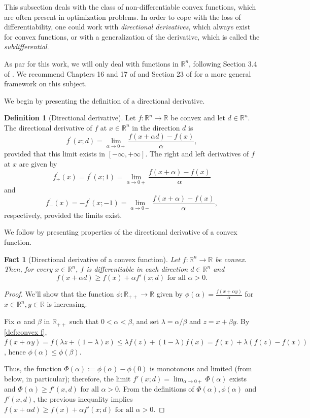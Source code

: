 \documentclass[smallextended,numbook,nospthms]{svjour3}
\theoremstyle{plain}
\newtheorem{fact}[theorem]{Fact}
\theoremstyle{definition}
\newtheorem{definition}[theorem]{Definition}
\def\RR{\mathds R}
\begin{document}
This subsection deals with the class of non-differentiable convex functions, which are often present in optimization problems. In order to cope with the loss of differentiability, one could work with \emph{directional derivatives}, which always exist for convex functions, or with a generalization of the derivative, which is called the \emph{subdifferential}.

As par for this work, we will only deal with functions in $\RR^n$, following Section 3.4 of \cite{Izmailov:2014}. We recommend Chapters 16 and 17 of \cite{BC2011} and Section 23 of \cite{Rockafellar:1996} for a more general framework on this subject.

We begin by presenting the definition of a directional derivative.
\begin{definition}[Directional derivative]\label{def:dir deriv}
Let $f: \RR^n \rightarrow \RR$ be convex and let $d \in \RR^n$. The directional derivative of $f$ at $x \in \RR^n$ in the direction $d$ is
$$
f^{\prime}(x;d)=\lim _{\alpha \rightarrow 0+} \frac{f(x+\alpha d)-f(x)}{\alpha},
$$
provided that this limit exists in $[-\infty,+\infty]$. 
The right and left derivatives of $f$ at $x$ are given by
$$
f_{+}^{\prime}(x)=f^{\prime}(x ; 1)=\lim _{\alpha \rightarrow 0+} \frac{f(x+\alpha)-f(x)}{\alpha}
$$
and
$$
f_{-}^{\prime}(x)=-f^{\prime}(x ;-1)=\lim _{\alpha \rightarrow 0-} \frac{f(x+\alpha)-f(x)}{\alpha},
$$
respectively, provided the limits exist.	
\end{definition}

We follow by presenting properties of the directional derivative of a convex function.
\begin{fact}[Directional derivative of a convex function]\label{fact:dir deriv conv}
Let $f: \RR^n \rightarrow \RR$ be convex. Then, for every $x \in \RR^n$, $f$ is differentiable in each direction $d \in \RR^n$ and
\[
f(x+\alpha d) \geq f(x) + \alpha f'(x;d) \text{ for all } \alpha>0.
\]
\end{fact}
\begin{proof}
	We'll show that the function $\phi:\RR_{++} \rightarrow \RR$ given by $\phi(\alpha)=\frac{f(x+\alpha y)}{\alpha}$ for $x \in \RR^n, y \in \RR$ is increasing.
	
	Fix $\alpha$ and $\beta$ in $\RR_{++}$ such that $0<\alpha<\beta$, and set $\lambda=\alpha / \beta$ and $z=x+\beta y$. By \cref{def:convex f}, $f(x+\alpha y)=f(\lambda z+(1-\lambda) x) \leqslant \lambda f(z)+(1-\lambda) f(x)=f(x)+\lambda(f(z)-f(x))$,	hence $\phi(\alpha) \leqslant \phi(\beta)$.
	
	Thus, the function $\Phi(\alpha):=\phi(\alpha)-\phi(0)$ is monotonous and limited (from below, in particular); therefore, the limit $f'(x;d)=\lim _{\alpha \rightarrow 0+} \Phi(\alpha)$ exists and
	$\Phi(\alpha) \geq f'(x,d)$ for all $\alpha > 0$. From the definitions of $\Phi(\alpha), \phi(\alpha)$ and $f'(x,d)$, the previous inequality implies $f(x+\alpha d) \geq f(x) + \alpha f'(x;d) \text{ for all } \alpha>0$.
\end{proof}
\end{document}
